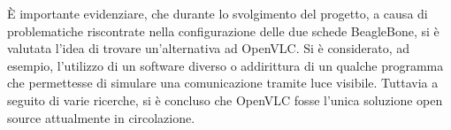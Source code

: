 È importante evidenziare, che durante lo svolgimento del progetto, a causa di problematiche riscontrate nella configurazione delle due schede BeagleBone, si è valutata l'idea di trovare un'alternativa ad OpenVLC. Si è considerato, ad esempio, l'utilizzo di un software diverso o addirittura di un qualche programma che permettesse di simulare una comunicazione tramite luce visibile. Tuttavia a seguito di varie ricerche, si è concluso che OpenVLC fosse l'unica soluzione open source attualmente in circolazione.
